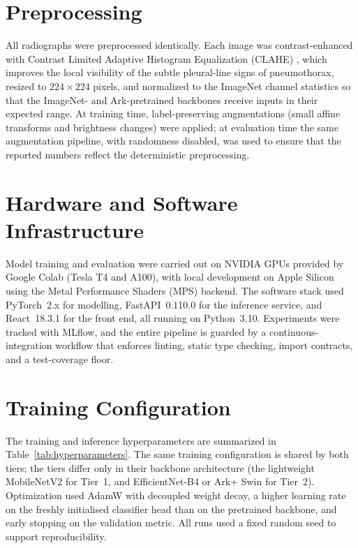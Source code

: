\section{Preprocessing}
All radiographs were preprocessed identically. Each image was contrast-enhanced with Contrast Limited Adaptive Histogram Equalization (CLAHE) \cite{zuiderveld1994contrast}, which improves the local visibility of the subtle pleural-line signs of pneumothorax, resized to $224 \times 224$ pixels, and normalized to the ImageNet channel statistics so that the ImageNet- and Ark-pretrained backbones receive inputs in their expected range. At training time, label-preserving augmentations (small affine transforms and brightness changes) were applied; at evaluation time the same augmentation pipeline, with randomness disabled, was used to ensure that the reported numbers reflect the deterministic preprocessing.

\section{Hardware and Software Infrastructure}
Model training and evaluation were carried out on NVIDIA GPUs provided by Google Colab (Tesla T4 and A100), with local development on Apple Silicon using the Metal Performance Shaders (MPS) backend. The software stack used PyTorch~2.x for modelling, FastAPI~0.110.0 for the inference service, and React~18.3.1 for the front end, all running on Python~3.10. Experiments were tracked with MLflow, and the entire pipeline is guarded by a continuous-integration workflow that enforces linting, static type checking, import contracts, and a test-coverage floor.

\section{Training Configuration}
The training and inference hyperparameters are summarized in Table~\ref{tab:hyperparameters}. The same training configuration is shared by both tiers; the tiers differ only in their backbone architecture (the lightweight MobileNetV2 for Tier~1, and EfficientNet-B4 or Ark+ Swin for Tier~2). Optimization used AdamW \cite{loshchilov2019decoupled} with decoupled weight decay, a higher learning rate on the freshly initialised classifier head than on the pretrained backbone, and early stopping on the validation metric. All runs used a fixed random seed to support reproducibility.



